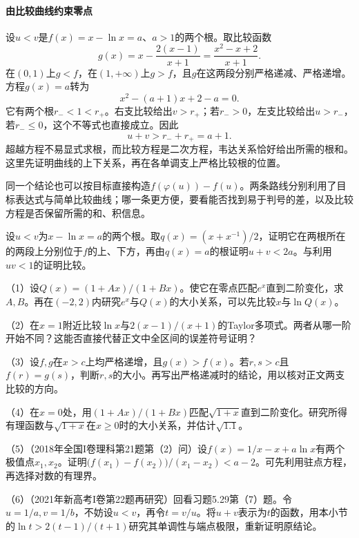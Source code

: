 \paragraph{由比较曲线约束零点} \mbox{}

设\(u<v\)是\(f(x)=x-\ln x=a\)、\(a>1\)的两个根。取比较函数
\begin{equation*}
 g(x)=x-\frac{2(x-1)}{x+1}
     =\frac{x^2-x+2}{x+1}.
\end{equation*}
在\((0,1)\)上\(g<f\)，在\((1,+\infty)\)上\(g>f\)，且\(g\)在这两段分别严格递减、严格递增。方程\(g(x)=a\)转为
\begin{equation*}
 x^2-(a+1)x+2-a=0.
\end{equation*}
它有两个根\(r_-<1<r_+\)。右支比较给出\(v>r_+\)；若\(r_->0\)，左支比较给出\(u>r_-\)，若\(r_-\le0\)，这个不等式也直接成立。因此
\begin{equation*}
 u+v>r_-+r_+=a+1.
\end{equation*}
超越方程不易显式求根，而比较方程是二次方程，韦达关系恰好给出所需的根和。这里先证明曲线的上下关系，再在各单调支上严格比较根的位置。

同一个结论也可以按目标直接构造\(f(\varphi(u))-f(u)\)。两条路线分别利用了目标表达式与简单比较曲线；哪一条更方便，要看能否找到易于判号的差，以及比较方程是否保留所需的和、积信息。

\begin{example}
设\(u<v\)为\(x-\ln x=a\)的两个根。取\(q(x)=(x+x^{-1})/2\)，证明它在两根所在的两段上分别位于\(f\)的上、下方，再由\(q(x)=a\)的根证明\(u+v<2a\)。与利用\(uv<1\)的证明比较。
\end{example}

\begin{exercise}
\mbox{}\par\nobreak

（1）设\(Q(x)=(1+Ax)/(1+Bx)\)。使它在零点匹配\(e^x\)直到二阶变化，求\(A,B\)。再在\((-2,2)\)内研究\(e^x\)与\(Q(x)\)的大小关系，可以先比较\(x\)与\(\ln Q(x)\)。

（2）在\(x=1\)附近比较\(\ln x\)与\(2(x-1)/(x+1)\)的Taylor多项式。两者从哪一阶开始不同？这能否直接代替正文中全区间的误差符号证明？

（3）设\(f,g\)在\(x>c\)上均严格递增，且\(g(x)>f(x)\)。若\(r,s>c\)且\(f(r)=g(s)\)，判断\(r,s\)的大小。再写出严格递减时的结论，用以核对正文两支比较的方向。

（4）在\(x=0\)处，用\((1+Ax)/(1+Bx)\)匹配\(\sqrt{1+x}\)直到二阶变化。研究所得有理函数与\(\sqrt{1+x}\)在\(x\ge0\)时的大小关系，并估计\(\sqrt{1.1}\)。

（5）（2018年全国I卷理科第21题第（2）问）设\(f(x)=1/x-x+a\ln x\)有两个极值点\(x_1,x_2\)。证明\(\bigl(f(x_1)-f(x_2)\bigr)/(x_1-x_2)<a-2\)。可先利用驻点方程，再选择对数的有理界。

（6）（2021年新高考I卷第22题再研究）回看习题5.29第（7）题。令\(u=1/a,v=1/b\)，不妨设\(u<v\)，再令\(t=v/u\)。将\(u+v\)表示为\(t\)的函数，用本小节的\(\ln t>2(t-1)/(t+1)\)研究其单调性与端点极限，重新证明原结论。
\end{exercise}
